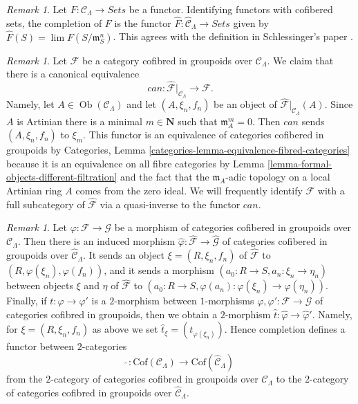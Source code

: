 \documentclass{stacks-project}
\theoremstyle{plain}
\theoremstyle{definition}
\theoremstyle{remark}
\newtheorem{remark}[subsection]{Remark}
\numberwithin{equation}{subsection}
\def\lim{\mathop{\mathrm{lim}}\nolimits}
\def\Ob{\mathop{\mathrm{Ob}}\nolimits}
\begin{document}
\begin{remark}
\label{remark-completion-functor}
Let $F: \mathcal{C}_\Lambda \to \textit{Sets}$ be a functor.
Identifying functors with cofibered sets, the completion of $F$ is the functor
$\widehat{F} : \widehat{\mathcal{C}}_\Lambda \to \textit{Sets}$
given by $\widehat{F}(S) = \lim F(S/\mathfrak{m}_S^{n})$.  This agrees
with the definition in Schlessinger's paper \cite{Sch}.
\end{remark}

\begin{remark}
\label{remark-restrict-completion}
Let $\mathcal{F}$ be a category cofibred in groupoids over
$\mathcal{C}_\Lambda$. We claim that there is a canonical
equivalence
$$
can :
\widehat{\mathcal{F}}|_{\mathcal{C}_\Lambda}
\longrightarrow
\mathcal{F}.
$$
Namely, let $A \in \Ob(\mathcal{C}_\Lambda)$ and let
$(A, \xi_n, f_n)$ be an object of
$\widehat{\mathcal{F}}|_{\mathcal{C}_\Lambda}(A)$.
Since $A$ is Artinian there is a minimal $m \in \mathbf{N}$
such that $\mathfrak m_A^m = 0$. Then $can$ sends $(A, \xi_n, f_n)$ to $\xi_m$.
This functor is an equivalence of categories cofibered in groupoids by
Categories, Lemma \ref{categories-lemma-equivalence-fibred-categories}
because it is an equivalence on all fibre categories by
Lemma \ref{lemma-formal-objects-different-filtration}
and the fact that the $\mathfrak m_A$-adic topology on a local
Artinian ring $A$ comes from the zero ideal. We will frequently identify
$\mathcal{F}$ with a full subcategory of $\widehat{\mathcal{F}}$ via a
quasi-inverse to the functor $can$.
\end{remark}

\begin{remark}
\label{remark-completion-morphism}
Let $\varphi : \mathcal{F} \to \mathcal{G}$ be a morphism of categories
cofibered in groupoids over $\mathcal{C}_\Lambda$. Then there is an induced
morphism
$\widehat{\varphi}: \widehat{\mathcal{F}} \to \widehat{\mathcal{G}}$
of categories cofibered in groupoids over $\widehat{\mathcal{C}}_\Lambda$.
It sends an object $\xi = (R, \xi_n, f_n)$ of
$\widehat{\mathcal{F}}$ to $(R, \varphi(\xi_n), \varphi(f_n))$, and it sends a
morphism $(a_0 : R \to S, a_n : \xi_n \to \eta_n)$ between
objects $\xi$ and $\eta$ of $\widehat{\mathcal{F}}$ to
$(a_0 : R \to S, \varphi(a_n) : \varphi(\xi_n) \to \varphi(\eta_n))$.
Finally, if $t : \varphi \to \varphi'$ is a $2$-morphism between
$1$-morphisms $\varphi, \varphi': \mathcal{F} \to \mathcal{G}$ of
categories cofibred in groupoids, then we obtain a $2$-morphism
$\widehat{t} : \widehat{\varphi} \to \widehat{\varphi}'$. Namely, for
$\xi = (R, \xi_n, f_n)$ as above we set
$\widehat{t}_\xi = (t_{\varphi(\xi_n)})$. Hence completion defines a
functor between $2$-categories
$$
\widehat{~} :
\text{Cof}(\mathcal{C}_\Lambda)
\longrightarrow
\text{Cof}(\widehat{\mathcal{C}}_\Lambda)
$$
from the $2$-category of categories cofibred in groupoids over
$\mathcal{C}_\Lambda$ to the $2$-category of categories cofibred
in groupoids over $\widehat{\mathcal{C}}_\Lambda$.
\end{remark}
\end{document}

